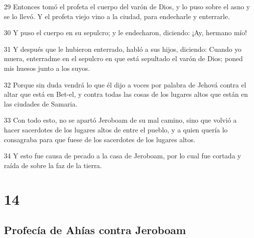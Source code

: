 \par 29 Entonces tomó el profeta el cuerpo del varón de Dios, y lo puso sobre el asno y se lo llevó. Y el profeta viejo vino a la ciudad, para endecharle y enterrarle.
\par 30 Y puso el cuerpo en su sepulcro; y le endecharon, diciendo: ¡Ay, hermano mío!
\par 31 Y después que le hubieron enterrado, habló a sus hijos, diciendo: Cuando yo muera, enterradme en el sepulcro en que está sepultado el varón de Dios; poned mis huesos junto a los suyos.
\par 32 Porque sin duda vendrá lo que él dijo a voces por palabra de Jehová contra el altar que está en Bet-el, y contra todas las cosas de los lugares altos que están en las ciudades de Samaria.
\par 33 Con todo esto, no se apartó Jeroboam de su mal camino, sino que volvió a hacer sacerdotes de los lugares altos de entre el pueblo, y a quien quería lo consagraba para que fuese de los sacerdotes de los lugares altos.
\par 34 Y esto fue causa de pecado a la casa de Jeroboam, por lo cual fue cortada y raída de sobre la faz de la tierra.

\chapter{14}

\section*{Profecía de Ahías contra Jeroboam}

